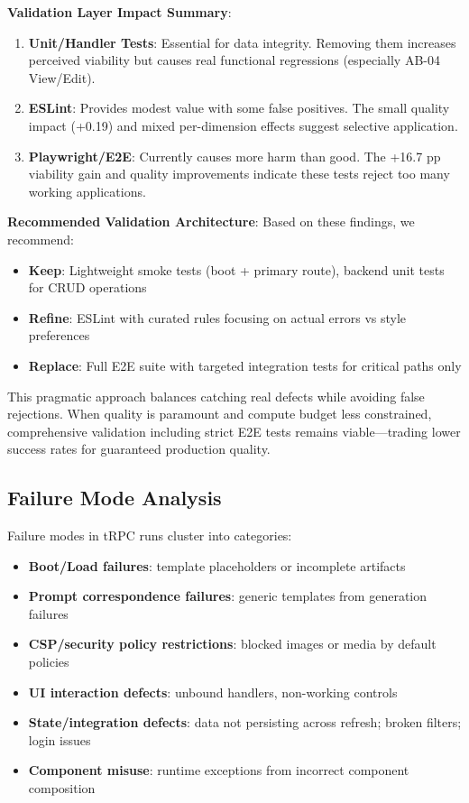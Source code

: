 \documentclass[conference]{IEEEtran}
\begin{document}
\textbf{Validation Layer Impact Summary}:
\begin{enumerate}
\item \textbf{Unit/Handler Tests}: Essential for data integrity. Removing them increases perceived viability but causes real functional regressions (especially AB-04 View/Edit).
\item \textbf{ESLint}: Provides modest value with some false positives. The small quality impact (+0.19) and mixed per-dimension effects suggest selective application.
\item \textbf{Playwright/E2E}: Currently causes more harm than good. The +16.7 pp viability gain and quality improvements indicate these tests reject too many working applications.
\end{enumerate}

\textbf{Recommended Validation Architecture}:
Based on these findings, we recommend:
\begin{itemize}
\item \textbf{Keep}: Lightweight smoke tests (boot + primary route), backend unit tests for CRUD operations
\item \textbf{Refine}: ESLint with curated rules focusing on actual errors vs style preferences
\item \textbf{Replace}: Full E2E suite with targeted integration tests for critical paths only
\end{itemize}

This pragmatic approach balances catching real defects while avoiding false rejections. When quality is paramount and compute budget less constrained, comprehensive validation including strict E2E tests remains viable—trading lower success rates for guaranteed production quality.

\subsection{Failure Mode Analysis}

Failure modes in tRPC runs cluster into categories:

\begin{itemize}
\item \textbf{Boot/Load failures}: template placeholders or incomplete artifacts
\item \textbf{Prompt correspondence failures}: generic templates from generation failures
\item \textbf{CSP/security policy restrictions}: blocked images or media by default policies
\item \textbf{UI interaction defects}: unbound handlers, non-working controls
\item \textbf{State/integration defects}: data not persisting across refresh; broken filters; login issues
\item \textbf{Component misuse}: runtime exceptions from incorrect component composition
\end{itemize}
\end{document}
